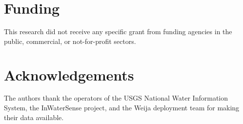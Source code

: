 \section*{Funding}
This research did not receive any specific grant from funding agencies in the public, commercial, or not-for-profit sectors.

\section*{Acknowledgements}
The authors thank the operators of the USGS National Water Information System, the InWaterSense project, and the Weija deployment team for making their data available.
